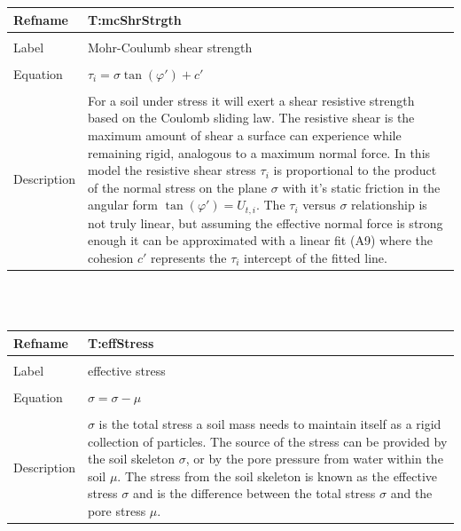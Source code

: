 \documentclass[12pt]{article}
\begin{document}
\noindent \begin{minipage}{\textwidth}
\begin{tabular}{p{} p{}}
\toprule \textbf{Refname} & \textbf{T:mcShrStrgth}
\label{T:mcShrStrgth}
\\ \midrule \\
Label & Mohr-Coulumb shear strength
\\ \midrule \\
Equation & $\tau{}_{i}=\sigma{}\tan\left(\varphi{}'\right)+c'$
\\ \midrule \\
Description & For a soil under stress it will exert a shear resistive strength based on the Coulomb sliding law. The resistive shear is the maximum amount of shear a surface can experience while remaining rigid, analogous to a maximum normal force. In this model the resistive shear stress $\tau{}_{i}$ is proportional to the product of the normal stress on the plane $\sigma{}$ with it's static friction in the angular form $\tan\left(\varphi{}'\right)=U_{t,i}$. The $\tau{}_{i}$ versus $\sigma{}$ relationship is not truly linear, but assuming the effective normal force is strong enough it can be approximated with a linear fit (A9) where the cohesion $c'$ represents the $\tau{}_{i}$ intercept of the fitted line.
\\ \bottomrule \end{tabular}
\end{minipage}\\
~\newline
\noindent \begin{minipage}{\textwidth}
\begin{tabular}{p{} p{}}
\toprule \textbf{Refname} & \textbf{T:effStress}
\label{T:effStress}
\\ \midrule \\
Label & effective stress
\\ \midrule \\
Equation & $\sigma{}=\sigma{}-\mu{}$
\\ \midrule \\
Description & $\sigma{}$ is the total stress a soil mass needs to maintain itself as a rigid collection of particles. The source of the stress can be provided by the soil skeleton $\sigma{}$, or by the pore pressure from water within the soil $\mu{}$. The stress from the soil skeleton is known as the effective stress $\sigma{}$ and is the difference between the total stress $\sigma{}$ and the pore stress $\mu{}$.
\\ \bottomrule \end{tabular}
\end{minipage}\\
\end{document}
